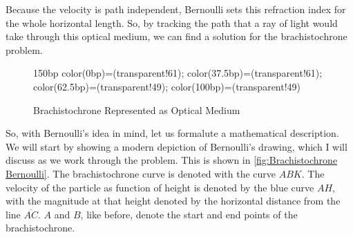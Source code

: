 Because the velocity is path independent, Bernoulli sets this refraction index for the whole horizontal length. So, by tracking the path that a ray of light would take through this optical medium, we can find a solution for the \gls{brachistochrone} problem.
\begin{figure}[ht]
    \centering
    
  
 {150bp} {color(0bp)=(transparent!61);
color(37.5bp)=(transparent!61);
color(62.5bp)=(transparent!49);
color(100bp)=(transparent!49) } 


    \caption{Brachistochrone Represented as Optical Medium}
    \label{fig:Brachistochrone Optical}
\end{figure}

So, with Bernoulli's idea in mind, let us formalute a mathematical description. We will start by showing a modern depiction of Bernoulli's drawing, which I will discuss as we work through the problem. This is shown in \autoref{fig:Brachistochrone Bernoulli}.  The \gls{brachistochrone} curve is denoted with the curve $ABK$. The velocity of the particle as function of height is denoted by the blue curve $AH$, with the magnitude at that height denoted by the horizontal distance from the line $\overline{AC}$. $A$ and $B$, like before, denote the start and end points of the \gls{brachistochrone}.


